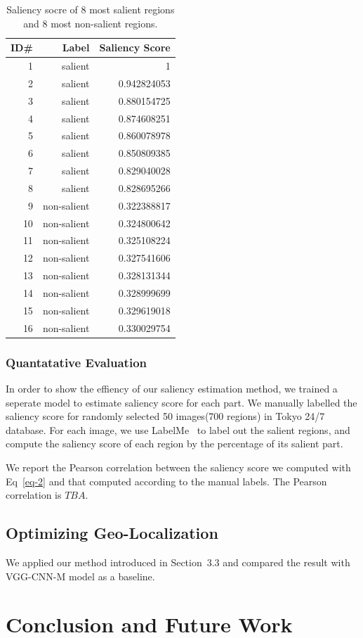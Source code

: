 \begin{table}
\begin{tabular}{r|r|r}
ID\# & Label & Saliency Score \\
\hline \hline
1 & salient & 1 \\
2 & salient & 0.942824053 \\
3 & salient & 0.880154725 \\
4 & salient & 0.874608251 \\
5 & salient & 0.860078978 \\
6 & salient & 0.850809385 \\
7 & salient & 0.829040028 \\
8 & salient & 0.828695266 \\
9 & non-salient & 0.322388817 \\
10 & non-salient & 0.324800642 \\
11 & non-salient & 0.325108224 \\
12 & non-salient & 0.327541606 \\
13 & non-salient & 0.328131344 \\
14 & non-salient & 0.328999699 \\
15 & non-salient & 0.329619018 \\
16 & non-salient & 0.330029754
\end{tabular}
\caption{Saliency socre of 8 most salient regions and 8 most non-salient regions.}
\label{table:saliencyscore}
\end{table}

\subsubsection{Quantatative Evaluation}
\par
In order to show the effiency of our saliency estimation method, we trained a seperate model to estimate saliency score for each part. We manually labelled the saliency score for randomly selected 50 images(700 regions) in Tokyo 24/7 database. For each image, we use LabelMe~\cite{Russell2008} to label out the salient regions, and compute the saliency score of each region by the percentage of its salient part. 
\par
We report the Pearson correlation between the saliency score we computed with Eq~\eqref{eq-2} and that computed according to the manual labels. The Pearson correlation is $TBA$. 
\subsection{Optimizing Geo-Localization}
\par
We applied our method introduced in Section~3.3 and compared the result with VGG-CNN-M model as a baseline. 
\section{Conclusion and Future Work}
